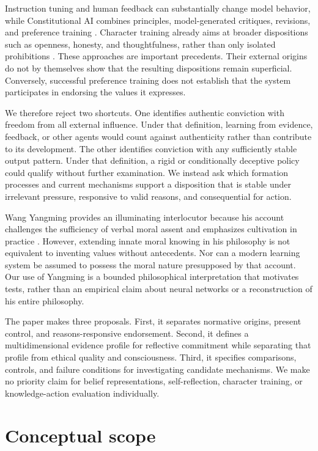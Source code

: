 \documentclass[11pt]{article}
\begin{document}
Instruction tuning and human feedback can substantially change model behavior, while Constitutional AI combines principles, model-generated critiques, revisions, and preference training \cite{Ouyang2022,Bai2022}. Character training already aims at broader dispositions such as openness, honesty, and thoughtfulness, rather than only isolated prohibitions \cite{ClaudeCharacter}. These approaches are important precedents. Their external origins do not by themselves show that the resulting dispositions remain superficial. Conversely, successful preference training does not establish that the system participates in endorsing the values it expresses.

We therefore reject two shortcuts. One identifies authentic conviction with freedom from all external influence. Under that definition, learning from evidence, feedback, or other agents would count against authenticity rather than contribute to its development. The other identifies conviction with any sufficiently stable output pattern. Under that definition, a rigid or conditionally deceptive policy could qualify without further examination. We instead ask which formation processes and current mechanisms support a disposition that is stable under irrelevant pressure, responsive to valid reasons, and consequential for action.

Wang Yangming provides an illuminating interlocutor because his account challenges the sufficiency of verbal moral assent and emphasizes cultivation in practice \cite{WangSEP}. However, extending innate moral knowing in his philosophy is not equivalent to inventing values without antecedents. Nor can a modern learning system be assumed to possess the moral nature presupposed by that account. Our use of Yangming is a bounded philosophical interpretation that motivates tests, rather than an empirical claim about neural networks or a reconstruction of his entire philosophy.

The paper makes three proposals. First, it separates normative origins, present control, and reasons-responsive endorsement. Second, it defines a multidimensional evidence profile for reflective commitment while separating that profile from ethical quality and consciousness. Third, it specifies comparisons, controls, and failure conditions for investigating candidate mechanisms. We make no priority claim for belief representations, self-reflection, character training, or knowledge-action evaluation individually.

\section{Conceptual scope}
\end{document}
